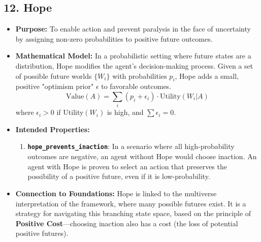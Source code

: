 \documentclass[11pt,a4paper]{article}
\begin{document}
\begin{itemize}
\subsection{12. Hope}
\begin{itemize}
    \item \textbf{Purpose:} To enable action and prevent paralysis in the face of uncertainty by assigning non-zero probabilities to positive future outcomes.
    \item \textbf{Mathematical Model:} In a probabilistic setting where future states are a distribution, Hope modifies the agent's decision-making process. Given a set of possible future worlds $\{W_i\}$ with probabilities $p_i$, Hope adds a small, positive "optimism prior" $\epsilon$ to favorable outcomes.
        \[ \text{Value}(A) = \sum_{i} (p_i + \epsilon_i) \cdot \text{Utility}(W_i | A) \]
        where $\epsilon_i > 0$ if Utility$(W_i)$ is high, and $\sum \epsilon_i = 0$.
    \item \textbf{Intended Properties:}
        \begin{enumerate}
            \item \textbf{\texttt{hope\_prevents\_inaction}}: In a scenario where all high-probability outcomes are negative, an agent without Hope would choose inaction. An agent with Hope is proven to select an action that preserves the possibility of a positive future, even if it is low-probability.
        \end{enumerate}
    \item \textbf{Connection to Foundations:} Hope is linked to the multiverse interpretation of the framework, where many possible futures exist. It is a strategy for navigating this branching state space, based on the principle of \textbf{Positive Cost}—choosing inaction also has a cost (the loss of potential positive futures).
\end{itemize}


\end{itemize}
\end{document}
